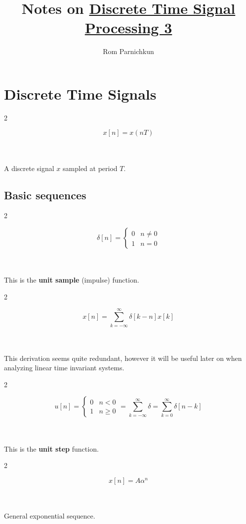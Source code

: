 \documentclass{article}
\theoremstyle{plain}
\newcommand{\myeq}[2]{
    \begin{multicols}{2}
            #1
    \columnbreak
        \\
        \\
        #2
    \end{multicols}
    \hrulefill
}
\begin{document}
\title{Notes on \href{https://books-library.net/files/books-library.net-02190127Xu1L6.pdf}{Discrete Time Signal Processing 3}}
\author{Rom Parnichkun}

\maketitle

\section{Discrete Time Signals}

\hrulefill
\myeq{
    \begin{equation}
        x[n] = x(nT)
    \end{equation}
}{A discrete signal $x$ sampled at period $T$.}

\subsection{Basic sequences}

\myeq{
    \begin{equation}
        \delta[n] = \begin{cases}
            0 & n \neq 0 \\
            1 & n = 0
        \end{cases}
    \end{equation}
}{This is the \textbf{unit sample} (impulse) function.}

\myeq{
    \begin{equation}
        x[n] = \sum_{k = -\infty}^{\infty}{\delta[k-n]x[k]}
    \end{equation}
}{
    This derivation seems quite redundant, however it will be useful later on when analyzing linear time invariant systems.}

\myeq{
    \begin{equation}
        u[n] = \begin{cases}
            0 & n < 0 \\
            1 & n \geq 0
        \end{cases}
        = \sum_{k = -\infty}^{\infty}{\delta} = \sum_{k = 0}^{\infty}{\delta[n-k]}
    \end{equation}
}{This is the \textbf{unit step} function.}

\myeq{
    \begin{equation}
        x[n] = A\alpha^n \label{eq:general_exponential}
    \end{equation}
}{General exponential sequence.}
\end{document}
